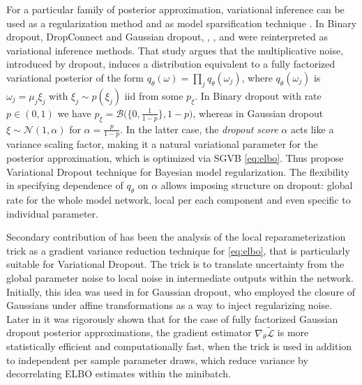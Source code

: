 \documentclass[a4paper,10pt]{article}
\begin{document}
For a particular family of posterior approximation, variational inference can be used
as a regularization method \cite{kingma_variational_2015} and as model sparsification
technique \cite{molchanov_variational_2017}. In \cite{kingma_variational_2015} Binary
dropout, DropConnect and Gaussian dropout, \cite{hinton_improving_2012,wan_regularization_2013},
\cite{srivastava_dropout_2014}, and \cite{wang_fast_2013} were reinterpreted as variational
inference methods. That study argues that the multiplicative noise, introduced by dropout,
induces a distribution equivalent to a fully factorized variational posterior of the form $
  q_\theta(\omega) = \prod_j q_{\theta}(\omega_j)
$, where $q_{\theta}(\omega_j)$ is $\omega_j = \mu_j \xi_j$ with $\xi_j \sim p(\xi_j)$
iid from some $p_\xi$. In Binary dropout with rate $p \in (0, 1)$ we have $
  p_\xi
    = \mathcal{B}\bigl(
        \{0, \tfrac1{1-p}\}, 1-p
      \bigr)
$, whereas in Gaussian dropout $
  \xi \sim \mathcal{N}(1, \alpha)
$ for $\alpha = \tfrac{p}{1-p}$. In the latter case, the \textit{dropout score} $\alpha$ acts
like a variance scaling factor, making it a natural variational parameter for the posterior
approximation, which is optimized via SGVB \eqref{eq:elbo}. Thus \cite{kingma_variational_2015}
propose Variational Dropout technique for Bayesian model regularization. The flexibility in
specifying dependence of $q_\theta$ on $\alpha$ allows imposing structure on dropout: global
rate for the whole model network, local per each component and even specific to individual
parameter.

Secondary contribution of \cite{kingma_variational_2015} has been the analysis of the local
reparameterization trick as a gradient variance reduction technique for \eqref{eq:elbo},
that is particularly suitable for Variational Dropout. The trick is to translate uncertainty
from the global parameter noise to local noise in intermediate outputs within the network.
Initially, this idea was used in \cite{who-dis-originally-22} for Gaussian dropout,
who employed the closure of Gaussians under affine transformations as a way to inject
regularizing noise. Later in \cite[app.~B]{kingma_variational_2015} it was rigorously shown
that for the case of fully factorized Gaussian dropout posterior approximations, the
gradient estimator $\nabla_\theta \tilde{\mathcal{L}}$ is more statistically efficient
and computationally fast, when the trick is used in addition to independent per sample
parameter draws, which reduce variance by decorrelating ELBO estimates within the minibatch.
\end{document}
